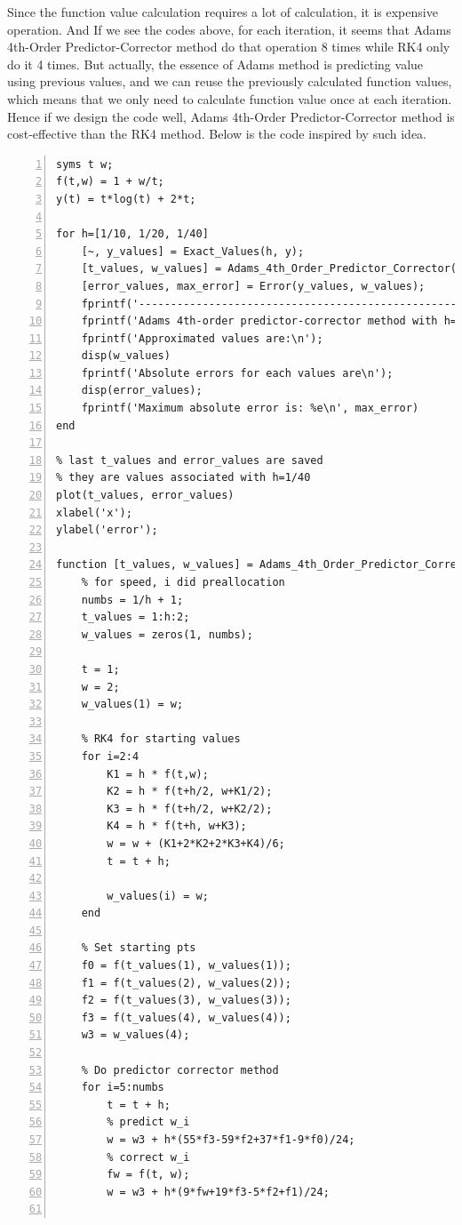 \documentclass{article}
\begin{document}
\begin{enumerate}
\begin{enumerate}[wide=10pt]
\begin{enumerate}[wide=30pt]
            Since the function value calculation requires a lot of calculation, it is expensive operation. And If we see the codes above, for each iteration, it seems that Adams 4th-Order Predictor-Corrector method do that operation 8 times while RK4 only do it 4 times. But actually, the essence of Adams method is predicting value using previous values, and we can reuse the previously calculated function values, which means that we only need to calculate function value once at each iteration. Hence if we design the code well, Adams 4th-Order Predictor-Corrector method is cost-effective than the RK4 method. Below is the code inspired by such idea. \begin{lstlisting}[frame=single, numbers=left, style=Matlab-editor]
syms t w;
f(t,w) = 1 + w/t;
y(t) = t*log(t) + 2*t;

for h=[1/10, 1/20, 1/40]
    [~, y_values] = Exact_Values(h, y);
    [t_values, w_values] = Adams_4th_Order_Predictor_Corrector(h, f);
    [error_values, max_error] = Error(y_values, w_values);
    fprintf('----------------------------------------------------\n');
    fprintf('Adams 4th-order predictor-corrector method with h=1/%d:\n', 1/h);
    fprintf('Approximated values are:\n');
    disp(w_values)
    fprintf('Absolute errors for each values are\n');
    disp(error_values);
    fprintf('Maximum absolute error is: %e\n', max_error)
end

% last t_values and error_values are saved
% they are values associated with h=1/40
plot(t_values, error_values)
xlabel('x');
ylabel('error');

function [t_values, w_values] = Adams_4th_Order_Predictor_Corrector(h, f)
    % for speed, i did preallocation
    numbs = 1/h + 1;
    t_values = 1:h:2;
    w_values = zeros(1, numbs);

    t = 1;
    w = 2;
    w_values(1) = w;

    % RK4 for starting values
    for i=2:4
        K1 = h * f(t,w);
        K2 = h * f(t+h/2, w+K1/2);
        K3 = h * f(t+h/2, w+K2/2);
        K4 = h * f(t+h, w+K3);
        w = w + (K1+2*K2+2*K3+K4)/6;
        t = t + h;

        w_values(i) = w;
    end

    % Set starting pts
    f0 = f(t_values(1), w_values(1));
    f1 = f(t_values(2), w_values(2));
    f2 = f(t_values(3), w_values(3));
    f3 = f(t_values(4), w_values(4));
    w3 = w_values(4);

    % Do predictor corrector method
    for i=5:numbs
        t = t + h;
        % predict w_i
        w = w3 + h*(55*f3-59*f2+37*f1-9*f0)/24;
        % correct w_i
        fw = f(t, w);
        w = w3 + h*(9*fw+19*f3-5*f2+f1)/24;


\end{lstlisting}
\end{enumerate}
\end{enumerate}
\end{enumerate}
\end{document}
